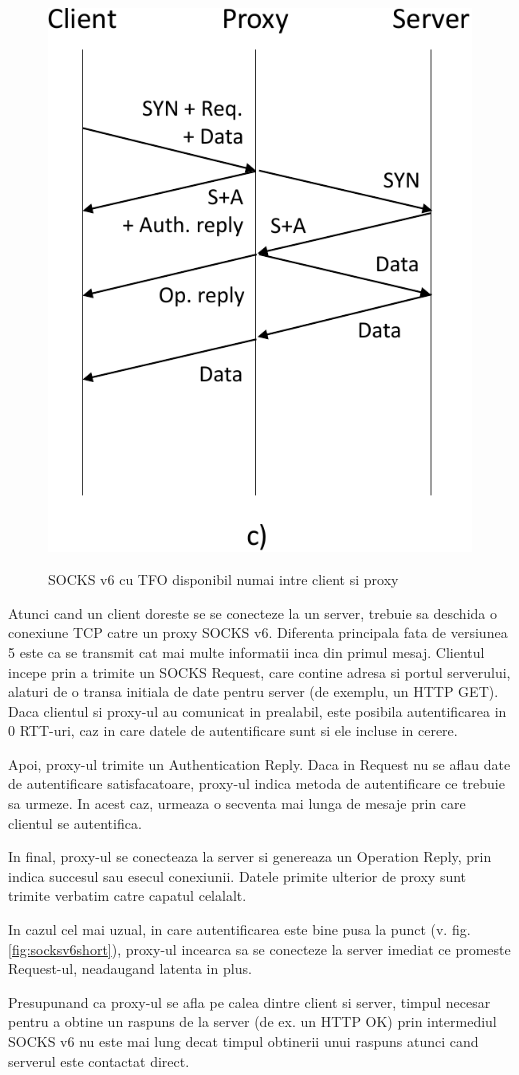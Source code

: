 \begin{figure}[t]
	\centering
	\includegraphics*[angle=0,height=.50\textwidth]{figures/socks/c-crop}
	\label{fig:yes_yes_no}
	\caption{SOCKS v6 cu TFO disponibil numai intre client si proxy}
\end{figure}

Atunci cand un client doreste se se conecteze la un server, trebuie sa deschida o conexiune TCP
catre un proxy SOCKS v6. Diferenta principala fata de versiunea 5 este ca se transmit cat mai multe informatii
inca din primul mesaj. Clientul incepe prin a trimite un SOCKS Request, care  contine adresa si
portul serverului, alaturi de o transa initiala de date pentru server (de exemplu, un HTTP GET).
Daca clientul si proxy-ul au comunicat in prealabil, este posibila autentificarea in 0 RTT-uri, caz in care
datele de autentificare sunt si ele incluse in cerere.

Apoi, proxy-ul trimite un Authentication Reply. Daca in Request nu se aflau date de autentificare satisfacatoare,
proxy-ul indica metoda de autentificare ce trebuie sa urmeze. In acest caz, urmeaza o secventa mai lunga de mesaje prin
care clientul se autentifica.

In final, proxy-ul se conecteaza la server si genereaza un Operation Reply, prin indica succesul sau esecul conexiunii.
Datele primite ulterior de proxy sunt trimite verbatim catre capatul celalalt.

In cazul cel mai uzual, in care autentificarea este bine pusa la punct (v. fig. \ref{fig:socksv6short}), proxy-ul
incearca sa se conecteze la server imediat ce promeste Request-ul, neadaugand latenta in plus.

Presupunand ca proxy-ul se afla pe calea dintre client si server, timpul necesar pentru a obtine un raspuns de la server
(de ex. un HTTP OK) prin intermediul SOCKS v6 nu este mai lung decat timpul obtinerii unui raspuns atunci cand serverul
este contactat direct.


